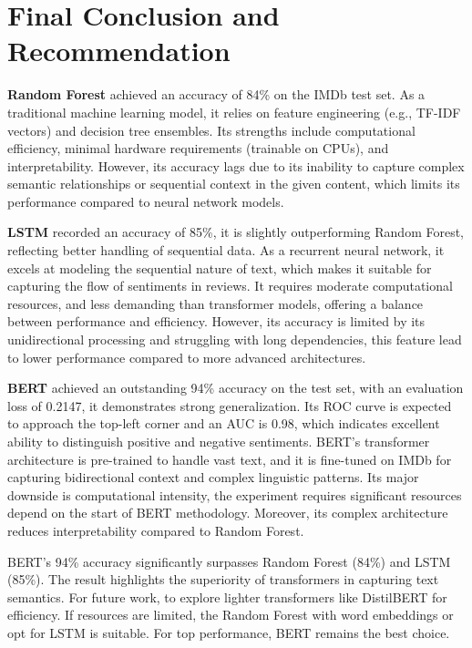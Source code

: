 \section{Final Conclusion and Recommendation}

\textbf{Random Forest} achieved an accuracy of 84\% on the IMDb test set. As a traditional machine learning model, it relies on feature engineering (e.g., TF-IDF vectors) and decision tree ensembles. Its strengths include computational efficiency, minimal hardware requirements (trainable on CPUs), and interpretability. However, its accuracy lags due to its inability to capture complex semantic relationships or sequential context in the given content, which limits its performance compared to neural network models.


\textbf{LSTM} recorded an accuracy of 85\%, it is slightly outperforming Random Forest, reflecting better handling of sequential data. As a recurrent neural network, it excels at modeling the sequential nature of text, which makes it suitable for capturing the flow of sentiments in reviews. It requires moderate computational resources, and less demanding than transformer models, offering a balance between performance and efficiency. However, its accuracy is limited by its unidirectional processing and struggling with long dependencies, this feature lead to lower performance compared to more advanced architectures.

\textbf{BERT} achieved an outstanding 94\% accuracy on the test set, with an evaluation loss of 0.2147, it demonstrates strong generalization. Its ROC curve is expected to approach the top-left corner and an AUC is 0.98, which indicates excellent ability to distinguish positive and negative sentiments. BERT's transformer architecture is pre-trained to handle vast text, and it is fine-tuned on IMDb for capturing bidirectional context and complex linguistic patterns. Its major downside is computational intensity, the experiment requires significant resources depend on the start of BERT methodology. Moreover, its complex architecture reduces interpretability compared to Random Forest.

BERT's 94\% accuracy significantly surpasses Random Forest (84\%) and LSTM (85\%). The result highlights the superiority of transformers in capturing text semantics. For future work, to explore lighter transformers like DistilBERT for efficiency. If resources are limited, the Random Forest with word embeddings or opt for LSTM is suitable. For top performance, BERT remains the best choice.